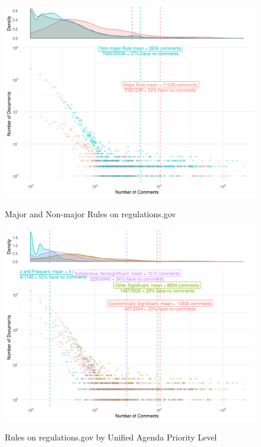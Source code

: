 \documentclass[
      12pt,
        ]{article}
\begin{document}
\begin{figure}[p!]
    \centering
        \caption{Major and Non-major Rules on regulations.gov}
    \includegraphics[width = 7in]{../Figs/major-comments-density-1.png}
    \label{fig:rules-major}
\end{figure}

\begin{figure}[p!]
    \centering
        \caption{Rules on regulations.gov by Unified Agenda Priority Level}
    \includegraphics[width = 7in]{../Figs/priority-comment-density-1.png}
    \label{fig:rules-priority}
\end{figure}

\clearpage
\end{document}
